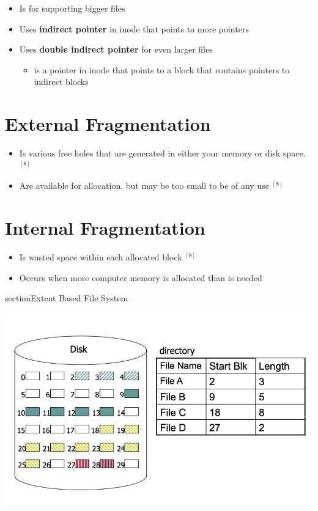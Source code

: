 \documentclass[12pt]{article}
\begin{document}
\begin{itemize}
    \item Is for supporting bigger files
    \item Uses \textbf{indirect pointer} in inode that points to more pointers
    \item Uses \textbf{double indirect pointer} for even larger files

    \begin{itemize}
        \item is a pointer in inode that points to a block that contains
        pointers to indirect blocks
    \end{itemize}
\end{itemize}

\section*{External Fragmentation}

\begin{itemize}
    \item Is various free holes that are generated in either your
    memory or disk space. $^{[8]}$
    \item Are available for allocation, but may be too small to be of
    any use $^{[8]}$
\end{itemize}

\section*{Internal Fragmentation}

\begin{itemize}
    \item Is wasted space within each allocated block $^{[8]}$
    \item Occurs when more computer memory is allocated than is needed
\end{itemize}


\*section{Extent Based File System}

\begin{center}
\includegraphics[width=\linewidth]{images/midterm_1_solution_14.png}
\end{center}
\end{document}
